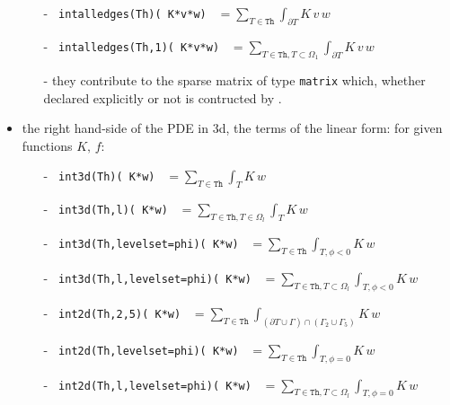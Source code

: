 \documentclass[a4paper,twoside,12pt]{book}
\def\p{\partial}
\begin{document}
\begin{itemize}
\begin{itemize}
       \item[-] \texttt{ intalledges(Th)( K*v*w) } $ \displaystyle = \sum_{T\in\mathtt{Th}}\int_{\p T } K\,v\,w  $ 
       \item[-] \texttt{ intalledges(Th,1)( K*v*w) } $ \displaystyle = \sum_{{T\in\mathtt{Th},T\subset \Omega_{1}}}\int_{\p T } K\,v\,w  $ 

       
       \item[-]  they contribute to the sparse matrix of type \texttt{matrix} which, whether declared explicitly or not is contructed by \freefempp.
       \end{itemize}

    \item  the right hand-side of the PDE in 3d,  the terms of the linear form: for given functions $K,\, f$:
         \begin{itemize}
       \item[-]
         \texttt{ int3d(Th)( K*w) } $ \displaystyle = \sum_{T\in\mathtt{Th}}\int_{T
          } K\,w  $
       \item[-]
         \texttt{ int3d(Th,l)( K*w) } $ \displaystyle = \sum_{T\in\mathtt{Th},T\in\Omega_l}\int_{T
          } K\,w  $
      \item[-]  \texttt{ int3d(Th,levelset=phi)( K*w) } $ \displaystyle = \sum_{T\in\mathtt{Th}}\int_{T,\phi<0} K\,w  $ 
       \item[-]  \texttt{ int3d(Th,l,levelset=phi)( K*w) } $ \displaystyle = \sum_{T\in\mathtt{Th},T\subset \Omega_{l}}\int_{T,\phi<0} K\,w  $ 
          
      \item[-] \texttt{ int2d(Th,2,5)( K*w) }   $ \displaystyle = \sum_{T\in\mathtt{Th}}\int_{(\p T\cup\Gamma) \cap ( \Gamma_2 \cup \Gamma_{5}) } K \,w  $
      \item[-]  \texttt{ int2d(Th,levelset=phi)( K*w) } $ \displaystyle = \sum_{T\in\mathtt{Th}}\int_{T,\phi=0} K\,w  $ 
       \item[-]  \texttt{ int2d(Th,l,levelset=phi)( K*w) } $ \displaystyle = \sum_{T\in\mathtt{Th},T\subset \Omega_{l}}\int_{T,\phi=0} K\,w  $ 
      

\end{itemize}
\end{itemize}
\end{document}
